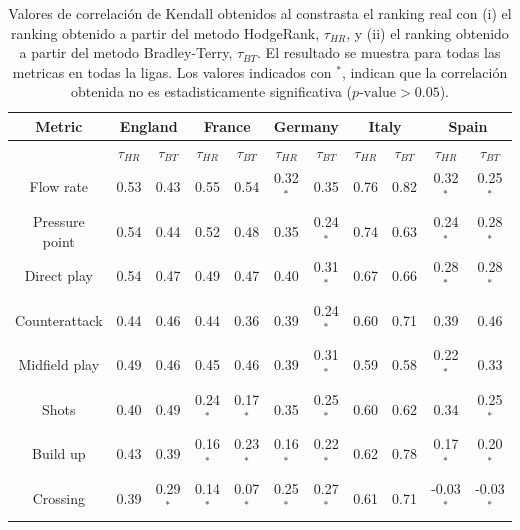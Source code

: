 \documentclass[preprint,12pt]{elsarticle}
\begin{document}
\begin{table}[htbp]
\centering
\caption{Valores de correlación de Kendall obtenidos al constrasta el ranking real con (i) el ranking obtenido a partir del metodo HodgeRank, $\tau_{HR}$, y (ii) el ranking obtenido a partir del metodo Bradley-Terry, $\tau_{BT}$. El resultado se muestra para todas las metricas en todas la ligas. Los valores indicados con $^*$, indican que la correlación obtenida no es estadisticamente significativa ($p\text{-value}>0.05$).}
\label{tab:comp}
\small %
%
 \begin{tabular}{|c|| *{10}{c|} } 
 \hline 
 Metric& \multicolumn{2}{c|}{England} & \multicolumn{2}{c|}{France} & \multicolumn{2}{c|}{Germany} & \multicolumn{2}{c|}{Italy} & \multicolumn{2}{c|}{Spain} \\ 
 \hline 
& $\tau_{HR}$ & $\tau_{BT}$  & $\tau_{HR}$ & $\tau_{BT}$  & $\tau_{HR}$ & $\tau_{BT}$  & $\tau_{HR}$ & $\tau_{BT}$  & $\tau_{HR}$ & $\tau_{BT}$  \\ 
 \hline 
 \hline 
Flow rate & 0.53& 0.43& 0.55& 0.54& 0.32$^*$& 0.35& 0.76& 0.82& 0.32$^*$& 0.25$^*$  \\ 
 \hline 
Pressure point & 0.54& 0.44& 0.52& 0.48& 0.35& 0.24$^*$ & 0.74& 0.63& 0.24$^*$& 0.28$^*$  \\ 
 \hline 
Direct play & 0.54& 0.47& 0.49& 0.47& 0.40& 0.31$^*$ & 0.67& 0.66& 0.28$^*$& 0.28$^*$  \\ 
 \hline 
Counterattack & 0.44& 0.46& 0.44& 0.36& 0.39& 0.24$^*$ & 0.60& 0.71& 0.39& 0.46 \\ 
 \hline 
Midfield play & 0.49& 0.46& 0.45& 0.46& 0.39& 0.31$^*$ & 0.59& 0.58& 0.22$^*$& 0.33 \\ 
 \hline 
Shots & 0.40& 0.49& 0.24$^*$& 0.17$^*$ & 0.35& 0.25$^*$ & 0.60& 0.62& 0.34& 0.25$^*$  \\ 
 \hline 
Build up & 0.43& 0.39& 0.16$^*$& 0.23$^*$ & 0.16$^*$& 0.22$^*$ & 0.62& 0.78& 0.17$^*$& 0.20$^*$  \\ 
 \hline 
Crossing & 0.39& 0.29$^*$ & 0.14$^*$& 0.07$^*$ & 0.25$^*$& 0.27$^*$ & 0.61& 0.71& -0.03$^*$& -0.03$^*$  \\ 
 \hline 
 \bottomrule 
 \end{tabular} %
\end{table}


	
\end{document}
